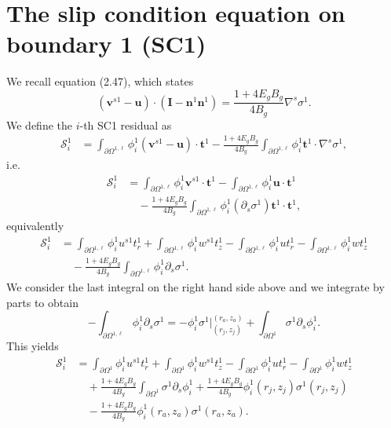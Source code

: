 \documentclass{article}
\begin{document}
\section{The slip condition equation on boundary 1 (SC1)} %
We recall equation (2.47), which states
\begin{equation}
\left( \mathbf{v}^{s1} - \mathbf{u} \right) \cdot \left( \mathbf{I} - \mathbf{n}^1 \mathbf{n}^1 \right) = \frac{1 + 4 E_g B_g}{4 B_g} \nabla^s \sigma^1. \tag{12.1}
\end{equation}
We define the $i$-th SC1 residual as
\begin{align}
\mathcal{S}_i^1 &= \int_{\partial \Omega^{1,\ell}} \phi_i^1 (\mathbf{v}^{s1} - \mathbf{u}) \cdot \mathbf{t}^1 - \frac{1 + 4 E_g B_g}{4 B_g} \int_{\partial \Omega^{1,\ell}} \phi_i^1 \mathbf{t}^1 \cdot \nabla^s \sigma^1, \tag{12.2}
\end{align}
i.e.
\begin{align}
\mathcal{S}_i^1 &= \int_{\partial \Omega^{1,\ell}} \phi_i^1 \mathbf{v}^{s1} \cdot \mathbf{t}^1 - \int_{\partial \Omega^{1,\ell}} \phi_i^1 \mathbf{u} \cdot \mathbf{t}^1 \nonumber\\
&\quad - \frac{1 + 4 E_g B_g}{4 B_g} \int_{\partial \Omega^{1,\ell}} \phi_i^1 (\partial_s \sigma^1) \mathbf{t}^1 \cdot \mathbf{t}^1, \tag{12.3}
\end{align}
equivalently
\begin{align}
\mathcal{S}_i^1 &= \int_{\partial \Omega^{1,\ell}} \phi_i^1 u^{s1} t_r^1 + \int_{\partial \Omega^{1,\ell}} \phi_i^1 w^{s1} t_z^1 - \int_{\partial \Omega^{1,\ell}} \phi_i^1 u t_r^1 - \int_{\partial \Omega^{1,\ell}} \phi_i^1 w t_z^1 \nonumber\\
&\quad - \frac{1 + 4 E_g B_g}{4 B_g} \int_{\partial \Omega^{1,\ell}} \phi_i^1 \partial_s \sigma^1. \tag{12.4}
\end{align}
We consider the last integral on the right hand side above and we integrate by parts to obtain
\begin{equation}
- \int_{\partial \Omega^{1,\ell}} \phi_i^1 \partial_s \sigma^1 = - \phi_i^1 \sigma^1 \Big|_{(r_j,z_j)}^{(r_a,z_a)} + \int_{\partial \Omega^{1}} \sigma^1 \partial_s \phi_i^1. \tag{12.5}
\end{equation}
This yields
\begin{align}
\mathcal{S}_i^1 &= \int_{\partial \Omega^{1}} \phi_i^1 u^{s1} t_r^1 + \int_{\partial \Omega^{1}} \phi_i^1 w^{s1} t_z^1 - \int_{\partial \Omega^{1}} \phi_i^1 u t_r^1 - \int_{\partial \Omega^{1}} \phi_i^1 w t_z^1 \nonumber\\
&\quad + \frac{1 + 4 E_g B_g}{4 B_g} \int_{\partial \Omega^{1}} \sigma^1 \partial_s \phi_i^1 + \frac{1 + 4 E_g B_g}{4 B_g} \phi_i^1(r_j,z_j) \sigma^1(r_j,z_j) \nonumber\\
&\quad - \frac{1 + 4 E_g B_g}{4 B_g} \phi_i^1(r_a,z_a) \sigma^1(r_a,z_a). \tag{12.6}
\end{align}
\end{document}
